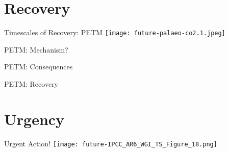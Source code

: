 \section{Recovery}

\begin{frame}{Timescales of Recovery: PETM}
    \centering
    \texttt{[image: future-palaeo-co2.1.jpeg]}
\end{frame}

\begin{frame}{PETM: Mechanism?}

\end{frame}

\begin{frame}{PETM: Consequences}

\end{frame}

\begin{frame}{PETM: Recovery}

\end{frame}

\section{Urgency}

\begin{frame}{Urgent Action!}
    \centering
    \texttt{[image: future-IPCC\_AR6\_WGI\_TS\_Figure\_18.png]}
\end{frame}







